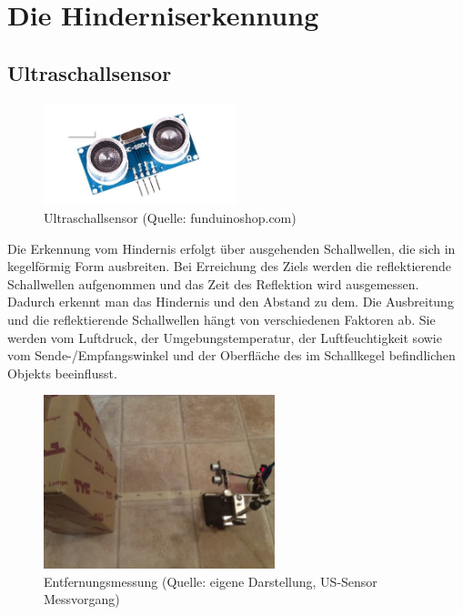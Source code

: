 \newpage
\renewcommand{\autoren}{Valentyn Chepil}

\section{Die Hinderniserkennung}
\subsection{Ultraschallsensor}

\begin{figure}[!h]  %
	\centering\includegraphics[width=0.5\textwidth]{images/Bild-1-1.png}
	\caption{Ultraschallsensor \newline(Quelle: funduinoshop.com)}
	\label{bild_1.1} %
\end{figure}

Die Erkennung vom Hindernis erfolgt über ausgehenden Schallwellen, die sich in kegelförmig Form  ausbreiten. Bei Erreichung des Ziels werden die reflektierende Schallwellen aufgenommen und das Zeit des Reflektion wird ausgemessen. Dadurch erkennt man das Hindernis und den Abstand zu dem. Die Ausbreitung und die reflektierende Schallwellen hängt von verschiedenen Faktoren ab. Sie werden vom Luftdruck, der Umgebungstemperatur, der Luftfeuchtigkeit sowie vom Sende-/Empfangswinkel und der Oberfläche des im Schallkegel befindlichen Objekts beeinflusst.


\begin{figure}[!h]  %
	\centering\includegraphics[width=0.6\textwidth]{images/Bild-1.jpg}
	\caption{Entfernungsmessung \newline (Quelle: eigene Darstellung, US-Sensor Messvorgang)}
	\label{bild_1} %
\end{figure}

